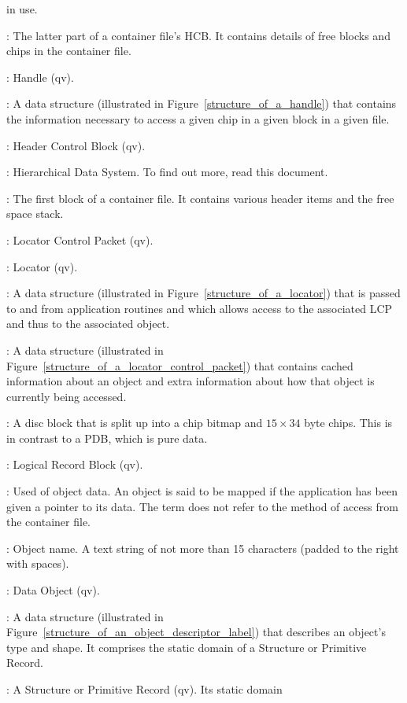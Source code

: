 \begin {description}
in use.
\item [Free Space Stack]: The latter part of a container file's HCB. It
contains details of free blocks and chips in the container file.
\item [HAN]: Handle (qv).
\item [Handle]: A data structure (illustrated in
Figure~\ref{structure_of_a_handle}) that contains the information necessary
to access a given chip in a given block in a given file.
\item [HCB]: Header Control Block (qv).
\item [HDS]: Hierarchical Data System. To find out more, read this document.
\item [Header Control Block]: The first block of a container file. It contains
various header items and the free space stack.
\item [LCP]: Locator Control Packet (qv).
\item [LOC]: Locator (qv).
\item [Locator]: A data structure (illustrated in
Figure~\ref{structure_of_a_locator}) that is passed to and from application
routines and which allows access to the associated LCP and thus to the
associated object.
\item [Locator Control Packet]: A data structure (illustrated in
Figure~\ref{structure_of_a_locator_control_packet}) that contains cached
information about an object and extra information about how that object is
currently being accessed.
\item [Logical Record Block]: A disc block that is split up into a chip bitmap
and $15 \times 34$ byte chips. This is in contrast to a PDB, which is pure
data.
\item [LRB]: Logical Record Block (qv).
\item [Mapped]: Used of object data. An object is said to be mapped if the
application has been given a pointer to its data. The term does not refer
to the method of access from the container file.
\item [Name]: Object name. A text string of not more than 15 characters
(padded to the right with spaces).
\item [Object]: Data Object (qv).
\item [Object Descriptor Label]: A data structure (illustrated in
Figure~\ref{structure_of_an_object_descriptor_label}) that describes an object's
type and shape. It comprises the static domain of a Structure or Primitive
Record.
\item [Object Record]: A Structure or Primitive Record (qv). Its static domain

\end{description}

